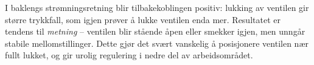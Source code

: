 I baklengs strømningsretning blir tilbakekoblingen positiv: lukking av ventilen gir større trykkfall, som igjen prøver å lukke ventilen enda mer. Resultatet er tendens til {\it metning} -- ventilen blir stående åpen eller smekker igjen, men unngår stabile mellomstillinger. Dette gjør det svært vanskelig å posisjonere ventilen nær fullt lukket, og gir urolig regulering i nedre del av arbeidsområdet.












